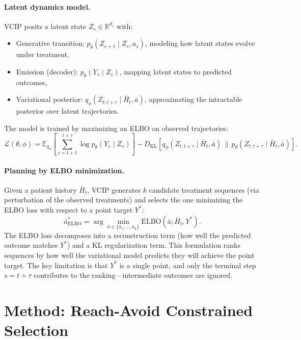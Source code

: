 \documentclass{article}
\newcommand{\R}{\mathbb{R}}
\newcommand{\E}{\mathbb{E}}
\newcommand{\KL}{\mathrm{KL}}
\newcommand{\bH}{\bar{H}}
\newcommand{\ba}{\bar{a}}
\begin{document}
\vspace{-0.8em}
\paragraph{Latent dynamics model.} VCIP posits a latent state $Z_s \in \R^{d_z}$ with:
\begin{itemize}
    \item Generative transition: $p_\theta(Z_{s+1} \mid Z_s, a_s)$, modeling how latent states evolve under treatment,
    \item Emission (decoder): $p_\theta(Y_s \mid Z_s)$, mapping latent states to predicted outcomes,
    \item Variational posterior: $q_\phi(Z_{t:t+\tau} \mid \bH_t, \ba)$, approximating the intractable posterior over latent trajectories.
\end{itemize}
The model is trained by maximizing an ELBO on observed trajectories:
\begin{equation}
\label{eq:elbo}
\mathcal{L}(\theta, \phi) = \E_{q_\phi}\!\left[\sum_{s=t+1}^{t+\tau} \log p_\theta(Y_s \mid Z_s)\right] - D_{\KL}\!\left[q_\phi(Z_{t:t+\tau} \mid \bH_t, \ba) \,\|\, p_\theta(Z_{t:t+\tau} \mid \bH_t, \ba)\right].
\end{equation}

\vspace{-0.8em}
\paragraph{Planning by ELBO minimization.} Given a patient history $\bH_t$, VCIP generates $k$ candidate treatment sequences (via perturbation of the observed treatments) and selects the one minimizing the ELBO loss with respect to a point target $Y^*$:
\begin{equation}
\label{eq:vcip_selection}
\ba^*_{\mathrm{ELBO}} = \arg\min_{\ba \in \{\ba_1, \ldots, \ba_k\}} \mathrm{ELBO}(\ba; \bH_t, Y^*).
\end{equation}
The ELBO loss decomposes into a reconstruction term (how well the predicted outcome matches $Y^*$) and a KL regularization term. This formulation ranks sequences by how well the variational model predicts they will achieve the point target. The key limitation is that $Y^*$ is a single point, and only the terminal step $s = t + \tau$ contributes to the ranking---intermediate outcomes are ignored.


\section{Method: Reach-Avoid Constrained Selection}
\label{sec:method}
\end{document}
